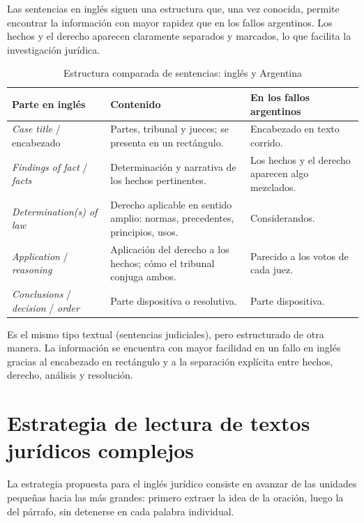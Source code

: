 \documentclass[12pt,oneside]{book}
\begin{document}
Las sentencias en inglés siguen una estructura que, una vez conocida, permite encontrar la información con mayor rapidez que en los fallos argentinos. Los hechos y el derecho aparecen claramente separados y marcados, lo que facilita la investigación jurídica.

\begin{table}[H]
\centering
\caption{Estructura comparada de sentencias: inglés y Argentina}
\begin{tabularx}{\textwidth}{>{\raggedright\arraybackslash}p{} >{\raggedright\arraybackslash}X >{\raggedright\arraybackslash}p{}}
\toprule
\textbf{Parte en inglés} & \textbf{Contenido} & \textbf{En los fallos argentinos} \\
\midrule
\textit{Case title} / encabezado & Partes, tribunal y jueces; se presenta en un rectángulo. & Encabezado en texto corrido. \\
\textit{Findings of fact} / \textit{facts} & Determinación y narrativa de los hechos pertinentes. & Los hechos y el derecho aparecen algo mezclados. \\
\textit{Determination(s) of law} & Derecho aplicable en sentido amplio: normas, precedentes, principios, usos. & Considerandos. \\
\textit{Application} / \textit{reasoning} & Aplicación del derecho a los hechos; cómo el tribunal conjuga ambos. & Parecido a los votos de cada juez. \\
\textit{Conclusions} / \textit{decision} / \textit{order} & Parte dispositiva o resolutiva. & Parte dispositiva. \\
\bottomrule
\end{tabularx}
\end{table}

\begin{note}
Es el mismo tipo textual (sentencias judiciales), pero estructurado de otra manera. La información se encuentra con mayor facilidad en un fallo en inglés gracias al encabezado en rectángulo y a la separación explícita entre hechos, derecho, análisis y resolución.
\end{note}

\section{Estrategia de lectura de textos jurídicos complejos}

La estrategia propuesta para el inglés jurídico consiste en avanzar de las unidades pequeñas hacia las más grandes: primero extraer la idea de la oración, luego la del párrafo, sin detenerse en cada palabra individual.
\end{document}
